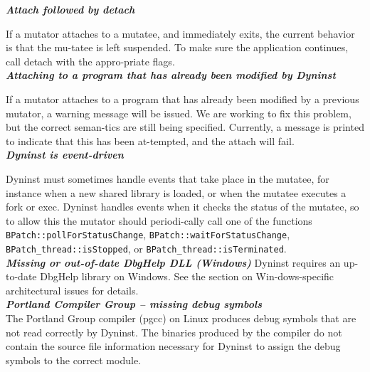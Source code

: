 \documentclass[twopages,a4paper]{article}
\begin{document}
\emph{\textbf {Attach followed by detach}}

If a mutator attaches to a mutatee, and immediately exits, the current behavior is that the mu-tatee is left suspended.  To make sure the application continues, call detach with the appro-priate flags.\\

\emph{\textbf{Attaching to a program that has already been modified by Dyninst}}

If a mutator attaches to a program that has already been modified by a previous mutator, a warning message will be issued. We are working to fix this problem, but the correct seman-tics are still being specified. Currently, a message is printed to indicate that this has been at-tempted, and the attach will fail.\\

\emph{\textbf{Dyninst is event-driven}}

Dyninst must sometimes handle events that take place in the mutatee, for instance when a new shared library is loaded, or when the mutatee executes a fork or exec. Dyninst handles events when it checks the status of the mutatee, so to allow this the mutator should periodi-cally call one of the functions \texttt{BPatch::pollForStatusChange}, \texttt{BPatch::waitForStatusChange}, \texttt{BPatch\_thread::isStopped}, or \texttt{BPatch\_thread::isTerminated}.\\

\emph{\textbf{Missing or out-of-date DbgHelp DLL (Windows)}}
	Dyninst requires an up-to-date DbgHelp library on Windows.  See the section on Win-dows-specific architectural issues for details.\\
	
\emph{\textbf{Portland Compiler Group – missing debug symbols}}
\\
	The Portland Group compiler (pgcc) on Linux produces debug symbols that are not read correctly by Dyninst.  The binaries produced by the compiler do not contain the source file information necessary for Dyninst to assign the debug symbols to the correct module.


\printindex[terms]

\pagebreak



\end{document}
